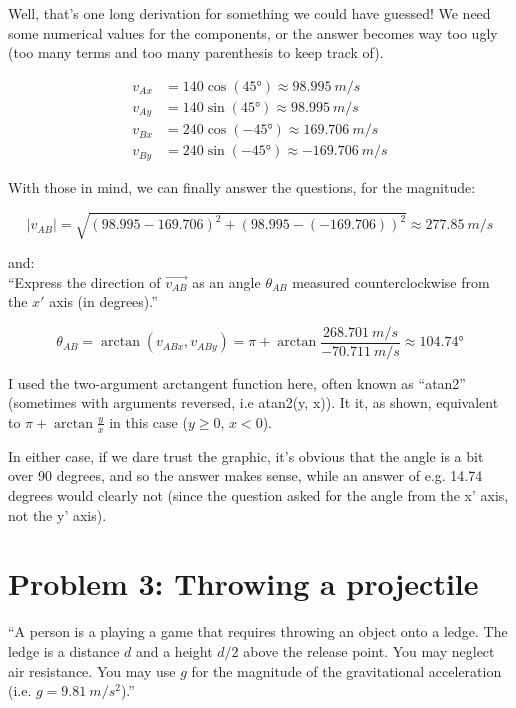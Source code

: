 \documentclass[8.01x]{subfiles}
\begin{document}
Well, that's one long derivation for something we could have guessed! We need some numerical values for the components, or the answer becomes way too ugly (too many terms and too many parenthesis to keep track of).

\begin{align}
v_{Ax} &= 140 \cos(\ang{45}) \approx \SI{98.995}{m/s}\\
v_{Ay} &= 140 \sin(\ang{45}) \approx \SI{98.995}{m/s}\\
v_{Bx} &= 240 \cos(-\ang{45}) \approx \SI{169.706}{m/s}\\
v_{By} &= 240 \sin(-\ang{45}) \approx \SI{-169.706}{m/s}
\end{align}

With those in mind, we can finally answer the questions, for the magnitude:

\begin{equation}
|v_{AB}| = \sqrt{(98.995 - 169.706)^2 + (98.995 - (-169.706))^2} \approx \SI{277.85}{m/s}
\end{equation}

and:\\
``Express the direction of $\vec{v_{AB}}$ as an angle $\theta_{AB}$ measured counterclockwise from the $x'$ axis (in degrees).''

\begin{equation}
\theta_{AB} = \arctan (v_{ABx}, v_{ABy}) = \pi + \arctan \frac{\SI{268.701}{m/s}}{\SI{-70.711}{m/s}} \approx \ang{104.74}
\end{equation}

I used the two-argument arctangent function here, often known as ``atan2'' (sometimes with arguments reversed, i.e atan2(y, x)). It it, as shown, equivalent to $\displaystyle \pi + \arctan \frac{y}{x}$ in this case ($y \geq 0$, $x < 0$).

In either case, if we dare trust the graphic, it's obvious that the angle is a bit over 90 degrees, and so the answer makes sense, while an answer of e.g. 14.74 degrees would clearly not (since the question asked for the angle from the x' axis, not the y' axis).

\section{Problem 3: Throwing a projectile}

``A person is a playing a game that requires throwing an object onto a ledge. The ledge is a distance $d$ and a height $d/2$ above the release point. You may neglect air resistance. You may use $g$ for the magnitude of the gravitational acceleration (i.e. $g = \SI{9.81}{m/s^2}$).''
\end{document}
